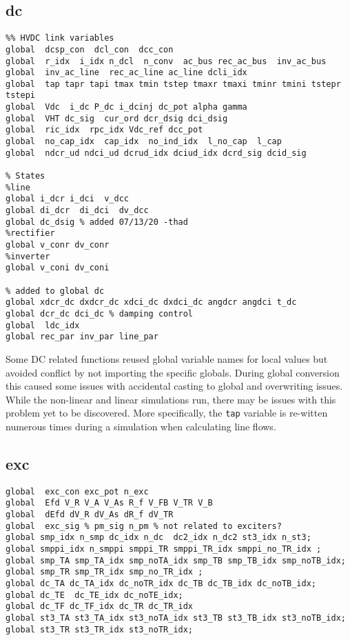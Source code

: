 \subsection{dc}
\begin{verbatim}
%% HVDC link variables 
global  dcsp_con  dcl_con  dcc_con
global  r_idx  i_idx n_dcl  n_conv  ac_bus rec_ac_bus  inv_ac_bus
global  inv_ac_line  rec_ac_line ac_line dcli_idx
global  tap tapr tapi tmax tmin tstep tmaxr tmaxi tminr tmini tstepr tstepi
global  Vdc  i_dc P_dc i_dcinj dc_pot alpha gamma 
global  VHT dc_sig  cur_ord dcr_dsig dci_dsig
global  ric_idx  rpc_idx Vdc_ref dcc_pot
global  no_cap_idx  cap_idx  no_ind_idx  l_no_cap  l_cap
global  ndcr_ud ndci_ud dcrud_idx dciud_idx dcrd_sig dcid_sig

% States
%line
global i_dcr i_dci  v_dcc
global di_dcr  di_dci  dv_dcc
global dc_dsig % added 07/13/20 -thad
%rectifier
global v_conr dv_conr
%inverter
global v_coni dv_coni

% added to global dc
global xdcr_dc dxdcr_dc xdci_dc dxdci_dc angdcr angdci t_dc
global dcr_dc dci_dc % damping control
global  ldc_idx
global rec_par inv_par line_par
\end{verbatim}
Some DC related functions reused global variable names for local values but avoided conflict by not importing the specific globals.
During global conversion this caused some issues with accidental casting to global and overwriting issues.
While the non-linear and linear simulations run, there may be issues with this problem yet to be discovered.
More specifically, the \verb|tap| variable is re-witten numerous times during a simulation when calculating line flows.



\subsection{exc}
\begin{verbatim}
global  exc_con exc_pot n_exc
global  Efd V_R V_A V_As R_f V_FB V_TR V_B
global  dEfd dV_R dV_As dR_f dV_TR
global  exc_sig % pm_sig n_pm % not related to exciters?
global smp_idx n_smp dc_idx n_dc  dc2_idx n_dc2 st3_idx n_st3;
global smppi_idx n_smppi smppi_TR smppi_TR_idx smppi_no_TR_idx ;
global smp_TA smp_TA_idx smp_noTA_idx smp_TB smp_TB_idx smp_noTB_idx;
global smp_TR smp_TR_idx smp_no_TR_idx ;
global dc_TA dc_TA_idx dc_noTR_idx dc_TB dc_TB_idx dc_noTB_idx;
global dc_TE  dc_TE_idx dc_noTE_idx;
global dc_TF dc_TF_idx dc_TR dc_TR_idx
global st3_TA st3_TA_idx st3_noTA_idx st3_TB st3_TB_idx st3_noTB_idx;
global st3_TR st3_TR_idx st3_noTR_idx;
\end{verbatim}

